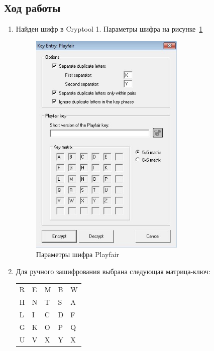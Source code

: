 \documentclass[a4paper, 14pt]{extarticle}
\begin{document}
\subsection{Ход работы}
\begin{enumerate}
    \item Найден шифр в Cryptool 1. Параметры шифра на рисунке~\ref{img:3:1}
    \begin{figure}[h]
        \centering
        \includegraphics[width=0.7\textwidth]{./img/S008.jpg}
        \caption{Параметры шифра Playfair}%
        \label{img:3:1}
    \end{figure}
    
    \item Для ручного зашифрования выбрана следующая матрица-ключ:
    \begin{table}[h]
    \centering
    \begin{tabular}{@{}lllll@{}}
    \toprule
    R & E & M & B & W \\
    H & N & T & S & A \\
    L & I & C & D & F \\
    G & K & O & P & Q \\
    U & V & X & Y & X \\
    \bottomrule
    \end{tabular}
    \end{table}
    

\end{enumerate}
\end{document}
